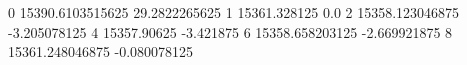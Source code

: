 0 15390.6103515625 29.2822265625
1 15361.328125 0.0
2 15358.123046875 -3.205078125
4 15357.90625 -3.421875
6 15358.658203125 -2.669921875
8 15361.248046875 -0.080078125
